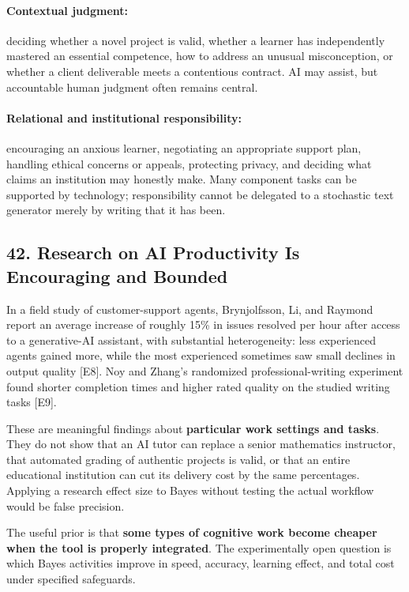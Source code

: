 \paragraph*{Contextual judgment:} deciding whether a novel project is valid, whether a learner has independently mastered an essential competence, how to address an unusual misconception, or whether a client deliverable meets a contentious contract. AI may assist, but accountable human judgment often remains central.

\paragraph*{Relational and institutional responsibility:} encouraging an anxious learner, negotiating an appropriate support plan, handling ethical concerns or appeals, protecting privacy, and deciding what claims an institution may honestly make. Many component tasks can be supported by technology; responsibility cannot be delegated to a stochastic text generator merely by writing that it has been.

\subsection*{42. Research on AI Productivity Is Encouraging and Bounded}

In a field study of customer-support agents, Brynjolfsson, Li, and Raymond report an average increase of roughly 15\% in issues resolved per hour after access to a generative-AI assistant, with substantial heterogeneity: less experienced agents gained more, while the most experienced sometimes saw small declines in output quality [E8]. Noy and Zhang's randomized professional-writing experiment found shorter completion times and higher rated quality on the studied writing tasks [E9].

These are meaningful findings about \textbf{particular work settings and tasks}. They do not show that an AI tutor can replace a senior mathematics instructor, that automated grading of authentic projects is valid, or that an entire educational institution can cut its delivery cost by the same percentages. Applying a research effect size to Bayes without testing the actual workflow would be false precision.

The useful prior is that \textbf{some types of cognitive work become cheaper when the tool is properly integrated}. The experimentally open question is which Bayes activities improve in speed, accuracy, learning effect, and total cost under specified safeguards.

